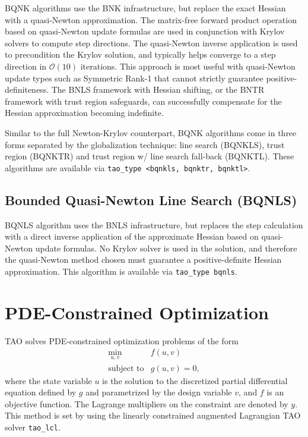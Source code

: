 \documentclass[]{book}
\begin{document}
BQNK algorithms use the BNK infrastructure, but replace the exact Hessian with a quasi-Newton 
approximation. The matrix-free forward product operation based on quasi-Newton update formulas 
are used in conjunction with Krylov solvers to compute step directions. The quasi-Newton inverse 
application is used to precondition the Krylov solution, and typically helps converge to a step 
direction in $\mathcal{O}(10)$ iterations. This approach is most useful with quasi-Newton update 
types such as Symmetric Rank-1 that cannot strictly guarantee positive-definiteness. The BNLS 
framework with Hessian shifting, or the BNTR framework with trust region safeguards, can 
successfully compensate for the Hessian approximation becoming indefinite.

Similar to the full Newton-Krylov counterpart, BQNK algorithms come in three forms separated by 
the globalization technique: line search (BQNKLS), trust region (BQNKTR) and trust region w/ line 
search fall-back (BQNKTL). These algorithms are available via {\tt tao\_type <bqnkls, bqnktr, bqnktl>}.

\subsection{Bounded Quasi-Newton Line Search (BQNLS)}\label{sec:bqnls}

BQNLS algorithm uses the BNLS infrastructure, but replaces the step calculation with a direct 
inverse application of the approximate Hessian based on quasi-Newton update formulas. No Krylov 
solver is used in the solution, and therefore the quasi-Newton method chosen must guarantee 
a positive-definite Hessian approximation. This algorithm is available via {\tt tao\_type bqnls}.

\section{PDE-Constrained Optimization}
\label{sec:lcl}

TAO solves PDE-constrained optimization problems of the form
\[
\begin{array}{ll}
\displaystyle \min_{u,v} & f(u,v) \\
\mbox{subject to} & g(u,v) = 0,
\end{array}
\]
where the state variable $u$ is the solution to the discretized
partial differential equation defined by $g$ and parametrized by 
the design variable $v$, and $f$ is an objective function.  The 
Lagrange multipliers on the constraint are denoted by $y$.
This method is set by using the linearly constrained augmented
Lagrangian TAO solver {\tt tao\_lcl}.
\end{document}
